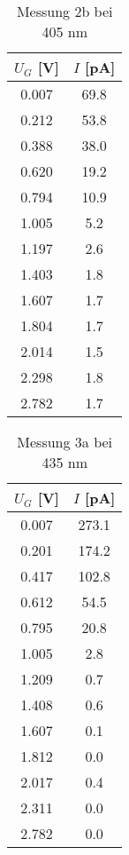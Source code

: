 \documentclass{article}
\begin{document}
\begin{table*}[h!]
  \centering
  \begin{tabular}{|c|c|}
      \hline
      $U_G$ [V] & $I$ [pA] \\
      \hline
      0.007  & 69.8 \\
      0.212  & 53.8 \\
      0.388  & 38.0 \\
      0.620  & 19.2 \\
      0.794  & 10.9 \\
      1.005  & 5.2  \\
      1.197  & 2.6  \\
      1.403  & 1.8  \\
      1.607  & 1.7  \\
      1.804  & 1.7  \\
      2.014  & 1.5  \\
      2.298  & 1.8  \\
      2.782  & 1.7  \\
      \hline
  \end{tabular}
  \caption{Messung 2b bei 405 nm}
  \label{tab:messung405}
\end{table*}

\begin{table*}[h!]
  \centering
  \begin{tabular}{|c|c|}
      \hline
      $U_G$ [V] & $I$ [pA] \\
      \hline
      0.007 & 273.1 \\
      0.201 & 174.2 \\
      0.417 & 102.8 \\
      0.612 & 54.5  \\
      0.795 & 20.8  \\
      1.005 & 2.8   \\
      1.209 & 0.7   \\
      1.408 & 0.6   \\
      1.607 & 0.1   \\
      1.812 & 0.0   \\
      2.017 & 0.4   \\
      2.311 & 0.0   \\
      2.782 & 0.0   \\
      \hline
  \end{tabular}
  \caption{Messung 3a bei 435 nm}
  \label{tab:messung3a}
\end{table*}
\end{document}
